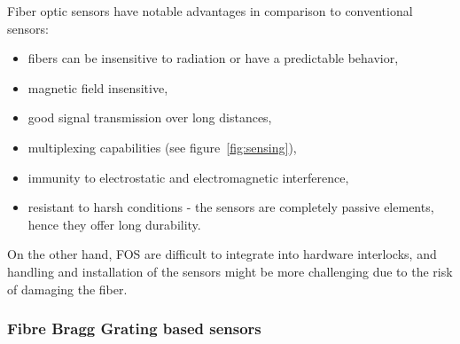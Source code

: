Fiber optic sensors have notable advantages in comparison to conventional sensors:

\begin{itemize}
    \item fibers can be insensitive to radiation or have a predictable behavior,
    \item magnetic field insensitive,
    \item good signal transmission over long distances,
    \item multiplexing capabilities (see figure~\ref{fig:sensing}),
    \item immunity to electrostatic and electromagnetic interference,
    \item resistant to harsh conditions - the sensors are completely passive elements, hence they offer long durability.
\end{itemize}
On the other hand, \gls{FOS} are difficult to integrate into hardware interlocks, and handling and installation of the sensors might be more challenging due to the risk of damaging the fiber.




\subsubsection{Fibre Bragg Grating based sensors}


